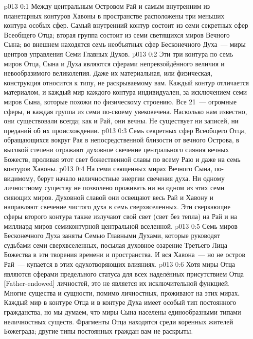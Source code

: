 \author{Совершенствователь Мудрости}
\vs p013 0:1 Между центральным Островом Рай и самым внутренним из планетарных контуров Хавоны в пространстве расположены три меньших контура особых сфер. Самый внутренний контур состоит из семи секретных сфер Всеобщего Отца; вторая группа состоит из семи светящихся миров Вечного Сына; во внешнем находятся семь необъятных сфер Бесконечного Духа~--- миры центров управления Семи Главных Духов.
\vs p013 0:2 Эти три контура по семь миров Отца, Сына и Духа являются сферами непревзойдённого величия и невообразимого великолепия. Даже их материальная, или физическая, конструкция относится к типу, не раскрываемому вам. Каждый контур отличается материалом, и каждый мир каждого контура индивидуален, за исключением семи миров Сына, которые похожи по физическому строению. Все 21~--- огромные сферы, и каждая группа из семи по\hyp{}своему увековечена. Насколько нам известно, они существовали всегда; как и Рай, они вечны. Не существует ни записей, ни преданий об их происхождении.
\vs p013 0:3 \pc Семь секретных сфер Всеобщего Отца, обращающихся вокруг Рая в непосредственной близости от вечного Острова, в высокой степени отражают духовное свечение центрального сияния вечных Божеств, проливая этот свет божественной славы по всему Раю и даже на семь контуров Хавоны.
\vs p013 0:4 \pc На семи священных мирах Вечного Сына, по\hyp{}видимому, берут начало неличностные энергии свечения духа. Ни одному личностному существу не позволено проживать ни на одном из этих семи сияющих миров. Духовной славой они освещают весь Рай и Хавону и направляют свечение чистого духа в семь сверхвселенных. Эти сверкающие сферы второго контура также излучают свой свет (свет без тепла) на Рай и на миллиард миров семиконтурной центральной вселенной.
\vs p013 0:5 \pc Семь миров Бесконечного Духа заняты Семью Главными Духами, которые руководят судьбами семи сверхвселенных, посылая духовное озарение Третьего Лица Божества в эти творения времени и пространства. И вся Хавона~--- но не остров Рай~--- купается в этих одухотворяющих влияниях.
\vs p013 0:6 \pc Хотя миры Отца являются сферами предельного статуса для всех наделённых присутствием Отца [Father\hyp{}endowed] личностей, это не является их исключительной функцией. Многие существа и сущности, помимо личностных, проживают на этих мирах. Каждый мир в контуре Отца и в контуре Духа имеет особый тип постоянного гражданства, но мы думаем, что миры Сына населены единообразными типами неличностных существ. Фрагменты Отца находятся среди коренных жителей Божеграда; другие типы постоянных граждан вам не раскрыты.

